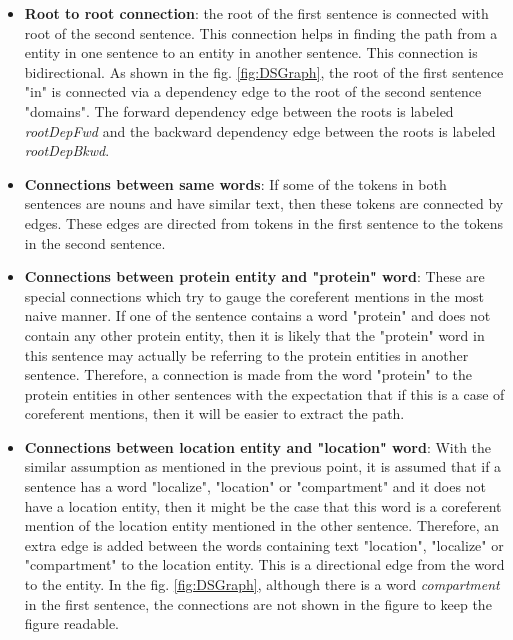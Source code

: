 \begin{itemize}

\item \textbf{Root to root connection}: the root of the first sentence is connected with root of the second sentence. This connection helps in finding the path from a entity in one sentence to an entity in another sentence. This connection is bidirectional. As shown in the fig. \ref{fig:DSGraph}, the root of the first sentence "in" is connected via a dependency edge to the root of the second sentence "domains". The forward dependency edge between the roots is labeled \textit{rootDepFwd} and the backward dependency edge between the roots is labeled \textit{rootDepBkwd}.

\item \textbf{Connections between same words}: If some of the tokens in both sentences are nouns and have similar text, then these tokens are connected by edges. These edges are directed from tokens in the first sentence to the tokens in the second sentence.

\item \textbf{Connections between protein entity and "protein" word}: These are special connections which try to gauge the coreferent mentions in the most naive manner. If one of the sentence contains a word "protein" and does not contain any other protein entity, then it is likely that the "protein" word in this sentence may actually be referring to the protein entities in another sentence. Therefore, a connection is made from the word "protein" to the protein entities in other sentences with the expectation that if this is a case of coreferent mentions, then it will be easier to extract the path. 

\item \textbf{Connections between location entity and "location" word}: With the similar assumption as mentioned in the previous point, it is assumed that if a sentence has a word "localize", "location" or "compartment" and it does not have a location entity, then it might be the case that this word is a coreferent mention of the location entity mentioned in the other sentence. Therefore, an extra edge is added between the words containing text "location", "localize" or "compartment" to the location entity. This is a directional edge from the word to the entity. In the fig. \ref{fig:DSGraph}, although there is a word \textit{compartment} in the first sentence, the connections are not shown in the figure to keep the figure readable.

\end{itemize}

